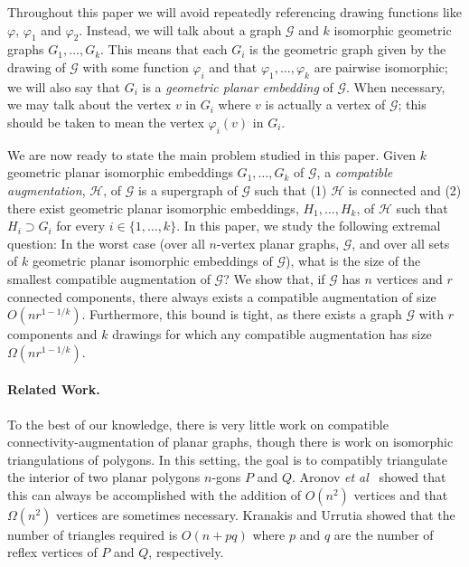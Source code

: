 \documentclass{patmorin}
\newcommand{\etal}{\emph{et al}}
\begin{document}
Throughout this paper we will avoid repeatedly
referencing drawing functions like $\varphi$, $\varphi_1$ and $\varphi_2$.
Instead, we will talk about a graph $\mathcal{G}$ and $k$ isomorphic
geometric graphs $G_1,\ldots,G_k$.  This means that
each $G_i$ is the geometric graph given by the drawing of $\mathcal{G}$
with some function $\varphi_i$ and that $\varphi_1,\ldots,\varphi_k$ are
pairwise isomorphic; we will also say that $G_i$ is a {\em geometric planar embedding} of $\mathcal{G}$. When necessary, we may talk about the vertex $v$
in $G_i$ where $v$ is actually a vertex of $\mathcal{G}$; this should
be taken to mean the vertex $\varphi_i(v)$ in $G_i$.

We are now ready to state the main problem studied in this paper.  Given $k$
geometric planar isomorphic embeddings $G_1, \ldots, G_k$ of $\mathcal
G$, a \emph{compatible augmentation}, $\mathcal H$, of $\mathcal G$ is
a supergraph of $\mathcal G$ such that (1) $\mathcal H$ is connected
and (2) there exist geometric planar isomorphic embeddings, $H_1,
\ldots, H_k$, of $\mathcal H$ such that $H_i\supset G_i$ for every
$i\in\{1,\ldots,k\}$.  In this paper, we study the following extremal question: In the worst case
(over all $n$-vertex planar graphs, $\mathcal G$, and over all sets of
$k$ geometric planar isomorphic embeddings of $\mathcal{G}$), what is the size of the smallest compatible augmentation of $\mathcal G$?
We show that, if $\mathcal{G}$ has $n$ vertices and $r$ connected components, there always exists a compatible augmentation of size $O(nr^{1-1/k})$. Furthermore, this bound is tight, as there exists a graph $\mathcal G$ with $r$ components and $k$
drawings for which any compatible augmentation has
size $\Omega(nr^{1-1/k})$.

\paragraph{Related Work.} To the best of our knowledge, there is very little work on
compatible connectivity-augmentation of planar graphs, though
there is work on isomorphic triangulations of polygons.   In this setting, the goal is to compatibly triangulate the interior of two planar polygons $n$-gons $P$ and $Q$.
Aronov \etal\ \cite{aronov.seidel.ea:compatible} showed that this can always
be accomplished with the addition of $O(n^2)$ vertices and that
$\Omega(n^2)$ vertices are sometimes necessary.  Kranakis and Urrutia
\cite{kranakis.urrutia:isomorphic} showed that the
number of triangles required is $O(n+pq)$ where $p$ and $q$ are the
number of reflex vertices of $P$ and $Q$, respectively.
\end{document}
